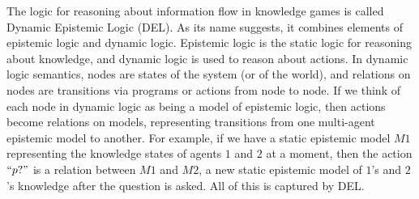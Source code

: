 

The logic for reasoning about information flow in knowledge games is called Dynamic Epistemic Logic (DEL). As its name suggests, it combines elements of epistemic logic and dynamic logic. Epistemic logic is the static logic for reasoning about knowledge, and dynamic logic is used to reason about actions. In dynamic logic semantics, nodes are states of the system (or of the world), and relations on nodes are transitions via programs or actions from node to node. If we think of each node in dynamic logic as being a model of epistemic logic, then actions become relations on models, representing transitions from one multi-agent epistemic model to another. For example, if we have a static epistemic model $M1$ representing the knowledge states of agents $1$ and $2$ at a moment, then the action $``p?"$ is a relation between $M1$ and $M2$, a new static epistemic model of $1$'s and $2$'s knowledge after the question is asked. All of this is captured by DEL.

